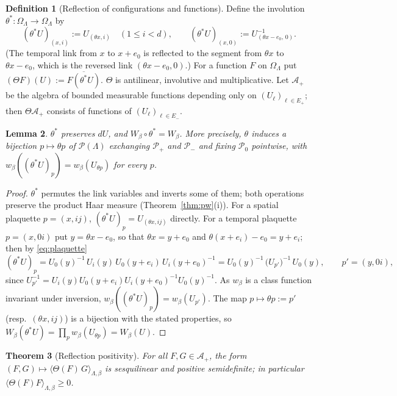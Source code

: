 \documentclass[11pt,a4paper]{article}
\newtheorem{theorem}{Theorem}[section]
\newtheorem{lemma}[theorem]{Lemma}
\theoremstyle{definition}
\newtheorem{definition}[theorem]{Definition}
\theoremstyle{remark}
\newcommand{\cA}{\mathcal{A}}
\newcommand{\cP}{\mathcal{P}}
\begin{document}
\begin{definition}[Reflection of configurations and functions]
Define the involution $\theta^*:\Omega_\Lambda\to\Omega_\Lambda$ by
\[
(\theta^*U)_{(x,i)}:=U_{(\theta x,i)}\quad(1\le i<d),\qquad
(\theta^*U)_{(x,0)}:=U_{(\theta x-e_0,\,0)}^{-1}.
\]
(The temporal link from $x$ to $x+e_0$ is reflected to the segment from $\theta x$ to $\theta x-e_0$, which is the
reversed link $(\theta x-e_0,0)$.) For a function $F$ on $\Omega_\Lambda$ put $(\Theta F)(U):=\overline{F(\theta^*U)}$.
$\Theta$ is antilinear, involutive and multiplicative. Let $\cA_+$ be the algebra of bounded measurable functions
depending only on $(U_\ell)_{\ell\in E_+}$; then $\Theta\cA_+$ consists of functions of $(U_\ell)_{\ell\in E_-}$.
\end{definition}

\begin{lemma}\label{lem:reflsym}
$\theta^*$ preserves $dU$, and $W_\beta\circ\theta^*=W_\beta$. More precisely, $\theta$ induces a bijection
$p\mapsto\theta p$ of $\cP(\Lambda)$ exchanging $\cP_+$ and $\cP_-$ and fixing $\cP_0$ pointwise, with
$w_\beta((\theta^*U)_p)=w_\beta(U_{\theta p})$ for every $p$.
\end{lemma}

\begin{proof}
$\theta^*$ permutes the link variables and inverts some of them; both operations preserve the product Haar measure
(Theorem~\ref{thm:pw}(i)). For a spatial plaquette $p=(x,ij)$, $(\theta^*U)_p=U_{(\theta x,ij)}$ directly. For a
temporal plaquette $p=(x,0i)$ put $y=\theta x-e_0$, so that $\theta x=y+e_0$ and $\theta(x+e_i)-e_0=y+e_i$; then by
\eqref{eq:plaquette}
\[
(\theta^*U)_p=U_0(y)^{-1}\,U_i(y)\,U_0(y+e_i)\,U_i(y+e_0)^{-1}
=U_0(y)^{-1}\,\bigl(U_{p'}\bigr)^{-1}\,U_0(y),\qquad p'=(y,0i),
\]
since $U_{p'}^{-1}=U_i(y)U_0(y+e_i)U_i(y+e_0)^{-1}U_0(y)^{-1}$. As $w_\beta$ is a class function invariant under
inversion, $w_\beta((\theta^*U)_p)=w_\beta(U_{p'})$. The map $p\mapsto\theta p:=p'$ (resp.\ $(\theta x,ij)$) is a
bijection with the stated properties, so $W_\beta(\theta^*U)=\prod_pw_\beta(U_{\theta p})=W_\beta(U)$.
\end{proof}

\begin{theorem}[Reflection positivity]\label{thm:rp}
For all $F,G\in\cA_+$, the form $(F,G)\mapsto\langle\Theta(F)\,G\rangle_{\Lambda,\beta}$ is sesquilinear and
positive semidefinite; in particular $\langle\Theta(F)F\rangle_{\Lambda,\beta}\ge0$.
\end{theorem}
\end{document}
